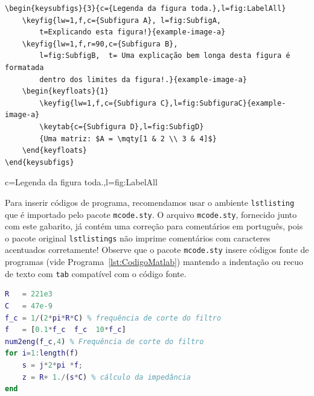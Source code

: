 {\begin{lstlisting}[language={[Latex]Tex},frame=single, numbers =none, caption= {Sintaxe \emph{keysubfigs} para inserir uma figura com uma legenda para a figura toda.},label=lst:FigKeysubfig]
\begin{keysubfigs}{3}{c={Legenda da figura toda.},l=fig:LabelAll}
	\keyfig{lw=1,f,c={Subfigura A},	l=fig:SubfigA,
		t=Explicando esta figura!}{example-image-a}
	\keyfig{lw=1,f,r=90,c={Subfigura B},
		l=fig:SubfigB, 	t= Uma explicação bem longa desta figura é formatada 
		dentro dos limites da figura!.}{example-image-a}
	\begin{keyfloats}{1}
		\keyfig{lw=1,f,c={Subfigura C},l=fig:SubfiguraC}{example-image-a}
		\keytab{c={Subfigura D},l=fig:SubfigD}
		{Uma matriz: $A = \mqty[1 & 2 \\ 3 & 4]$}
	\end{keyfloats}
\end{keysubfigs}
\end{lstlisting}
			
			
\begin{keysubfigs}{3}{c={Legenda da figura toda.},l=fig:LabelAll}
	\begin{keyfloats}{1}
	\end{keyfloats}
\end{keysubfigs}


Para inserir códigos de programa, recomendamos usar o ambiente \texttt{lstlisting} que é importado pelo pacote \texttt{mcode.sty}. O arquivo \texttt{mcode.sty}, fornecido junto com este gabarito,  já contém uma correção para comentários em  português, pois o pacote original \texttt{lstlistings} não imprime comentários com caracteres acentuados corretamente!
Observe que o pacote \texttt{mcode.sty} insere códigos fonte de programas (vide Programa~\ref{lst:CodigoMatlab}) mantendo a indentação ou recuo de texto com \texttt{tab} compatível com o código fonte.

\begin{lstlisting}[language=Matlab, frame=single,numbers =none, caption= {Código fonte com sintaxe Matlab.}, label=lst:CodigoMatlab]
R   = 221e3
C   = 47e-9 
f_c = 1/(2*pi*R*C) % frequência de corte do filtro
f   = [0.1*f_c  f_c  10*f_c]
num2eng(f_c,4) % Frequência de corte do filtro
for i=1:length(f)
	s = j*2*pi *f; 
	z = R+ 1./(s*C) % cálculo da impedância 
end


\end{lstlisting}}

